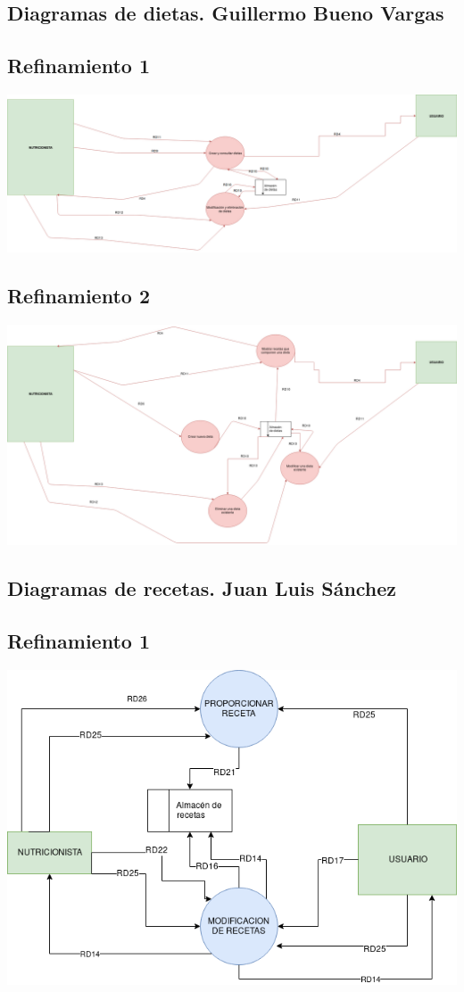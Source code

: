 \documentclass[12pt,letterpaper]{article}
\begin{document}
\subsection{Diagramas de dietas. Guillermo Bueno Vargas}
\subsection{Refinamiento 1}
\includegraphics[scale=0.3]{Refinamiento_1_Dietas.png}
\subsection{Refinamiento 2}
\includegraphics[scale=0.3]{Refinamiento_2_Dietas.png}
\newpage
\subsection{Diagramas de recetas. Juan Luis Sánchez}
\subsection{Refinamiento 1}
\includegraphics[scale=0.5]{Refinamiento_1_Recetas.png}
\end{document}

